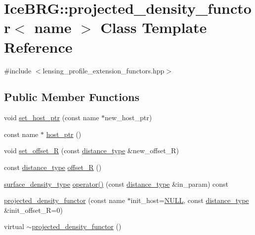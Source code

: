 \hypertarget{classIceBRG_1_1projected__density__functor}{\section{Ice\-B\-R\-G\-:\-:projected\-\_\-density\-\_\-functor$<$ name $>$ Class Template Reference}
\label{classIceBRG_1_1projected__density__functor}
}


{\ttfamily \#include $<$lensing\-\_\-profile\-\_\-extension\-\_\-functors.\-hpp$>$}

\subsection*{Public Member Functions}
\begin{DoxyCompactItemize}
\item 
void \hyperlink{classIceBRG_1_1projected__density__functor_a083e88c53aff6221e1356050c1e2d118}{set\-\_\-host\-\_\-ptr} (const name $\ast$new\-\_\-host\-\_\-ptr)
\item 
const name $\ast$ \hyperlink{classIceBRG_1_1projected__density__functor_ae5ec52d5fd90d15774e9993101333aa8}{host\-\_\-ptr} ()
\item 
void \hyperlink{classIceBRG_1_1projected__density__functor_af86b2bab997ee46dc3fd21487e22981a}{set\-\_\-offset\-\_\-\-R} (const \hyperlink{namespaceIceBRG_a45499647eb87e24c10ab32c628711cec}{distance\-\_\-type} \&new\-\_\-offset\-\_\-\-R)
\item 
const \hyperlink{namespaceIceBRG_a45499647eb87e24c10ab32c628711cec}{distance\-\_\-type} \hyperlink{classIceBRG_1_1projected__density__functor_af5d05065784a2eee5862199e76ba9327}{offset\-\_\-\-R} ()
\item 
\hyperlink{namespaceIceBRG_a80c597ef5ba0a32491d32a9f0083b02d}{surface\-\_\-density\-\_\-type} \hyperlink{classIceBRG_1_1projected__density__functor_aa03137511e069438efdf1698ac1dffd7}{operator()} (const \hyperlink{namespaceIceBRG_a45499647eb87e24c10ab32c628711cec}{distance\-\_\-type} \&in\-\_\-param) const 
\item 
\hyperlink{classIceBRG_1_1projected__density__functor_a97a1457b6e3d8a36fa4cb364d0728169}{projected\-\_\-density\-\_\-functor} (const name $\ast$init\-\_\-host=\hyperlink{lib_2IceBRG__main_2common_8h_a070d2ce7b6bb7e5c05602aa8c308d0c4}{N\-U\-L\-L}, const \hyperlink{namespaceIceBRG_a45499647eb87e24c10ab32c628711cec}{distance\-\_\-type} \&init\-\_\-offset\-\_\-\-R=0)
\item 
virtual \hyperlink{classIceBRG_1_1projected__density__functor_a2e842a2eac755b6ed5f3c0a4ec761e0a}{$\sim$projected\-\_\-density\-\_\-functor} ()
\end{DoxyCompactItemize}


